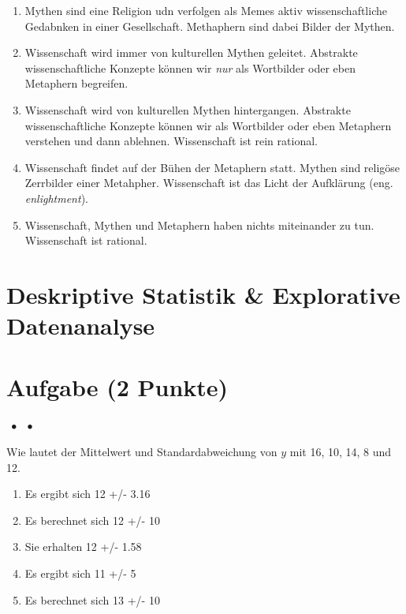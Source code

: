 \documentclass[a4paper, 9pt]{scrartcl}\usepackage[]{graphicx}\usepackage[]{xcolor}
\begin{document}
\begin{enumerate}
\item [\textbf{A} \msquare] Mythen sind eine Religion udn verfolgen als Memes aktiv wissenschaftliche Gedabnken in einer Gesellschaft. Methaphern sind dabei Bilder der Mythen.
\item [\textbf{B} \msquare] Wissenschaft wird immer von kulturellen Mythen geleitet. Abstrakte wissenschaftliche Konzepte können wir \textit{nur} als Wortbilder oder eben Metaphern begreifen.
\item [\textbf{C} \msquare] Wissenschaft wird von kulturellen Mythen hintergangen. Abstrakte wissenschaftliche Konzepte können wir als Wortbilder oder eben Metaphern verstehen und dann ablehnen. Wissenschaft ist rein rational.
\item [\textbf{D} \msquare] Wissenschaft findet auf der Bühen der Metaphern statt. Mythen sind religöse Zerrbilder einer Metahpher. Wissenschaft ist das Licht der Aufklärung (eng. \textit{enlightment}).
\item [\textbf{E} \msquare] Wissenschaft, Mythen und Metaphern haben nichts miteinander zu tun. Wissenschaft ist rational.
\end{enumerate} 
\section*{Deskriptive Statistik \& Explorative Datenanalyse}

\section{Aufgabe \hfill (2 Punkte)}

\ifcollection
\begin{flushright}
\tiny\vspace{-2Ex}
\textbf{\examinhaltstart}
\exammodulemathstat $\;\bullet$
\exammodulestat $\;\bullet$
\exammodulestatbbv 
\vspace{-1Ex}
\end{flushright}
\fi




Wie lautet der Mittelwert und Standardabweichung von $y$ mit 16, 10, 14, 8 und 12.



\begin{enumerate}
\item [\textbf{A} \msquare] Es ergibt sich 12 +/- 3.16
\item [\textbf{B} \msquare] Es berechnet sich 12 +/- 10
\item [\textbf{C} \msquare] Sie erhalten 12 +/- 1.58
\item [\textbf{D} \msquare] Es ergibt sich 11 +/- 5
\item [\textbf{E} \msquare] Es berechnet sich 13 +/- 10
\end{enumerate} 
\end{document}
